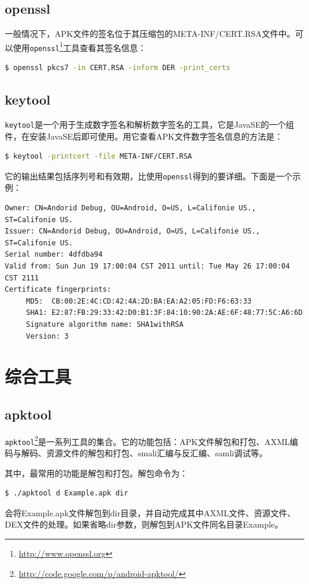 \subsection{openssl}
一般情况下，APK文件的签名位于其压缩包的META-INF/CERT.RSA文件中。可以使用\lstinline!openssl!\footnote{\url{http://www.openssl.org}}工具查看其签名信息：
\begin{lstlisting}[language=bash, numbers=none]
 $ openssl pkcs7 -in CERT.RSA -inform DER -print_certs
\end{lstlisting}

\subsection{keytool}
\lstinline!keytool!是一个用于生成数字签名和解析数字签名的工具，它是JavaSE的一个组件，在安装JavaSE后即可使用。用它查看APK文件数字签名信息的方法是：
\begin{lstlisting}[language=bash, numbers=none]
 $ keytool -printcert -file META-INF/CERT.RSA
\end{lstlisting}
它的输出结果包括序列号和有效期，比使用\lstinline!openssl!得到的要详细。下面是一个示例：

\begin{lstlisting}[language={}, numbers=none]
Owner: CN=Andorid Debug, OU=Android, O=US, L=Califonie US., ST=Califonie US.
Issuer: CN=Andorid Debug, OU=Android, O=US, L=Califonie US., ST=Califonie US.
Serial number: 4dfdba94
Valid from: Sun Jun 19 17:00:04 CST 2011 until: Tue May 26 17:00:04 CST 2111
Certificate fingerprints:
	 MD5:  CB:00:2E:4C:CD:42:4A:2D:BA:EA:A2:05:FD:F6:63:33
	 SHA1: E2:87:FB:29:33:42:D0:B1:3F:84:10:90:2A:AE:6F:48:77:5C:A6:6D
	 Signature algorithm name: SHA1withRSA
	 Version: 3
\end{lstlisting}

\section{综合工具}
\subsection{apktool}
\lstinline!apktool!\footnote{\url{http://code.google.com/p/android-apktool/}}是一系列工具的集合。它的功能包括：APK文件解包和打包、AXML编码与解码、资源文件的解包和打包、smali汇编与反汇编、samli调试等。

其中，最常用的功能是解包和打包。解包命令为：
\begin{lstlisting}[language=bash, numbers=none]
 $ ./apktool d Example.apk dir
\end{lstlisting}
会将Example.apk文件解包到dir目录，并自动完成其中AXML文件、资源文件、DEX文件的处理。如果省略dir参数，则解包到APK文件同名目录Example。

